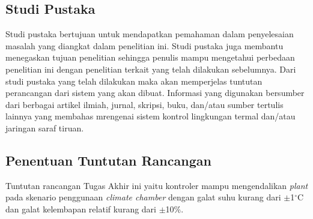 

\subsection{Studi Pustaka}
Studi pustaka bertujuan untuk mendapatkan pemahaman dalam penyelesaian masalah yang diangkat dalam penelitian ini. Studi pustaka juga membantu menegaskan tujuan penelitian sehingga penulis mampu mengetahui perbedaan penelitian ini dengan penelitian terkait yang telah dilakukan sebelumnya. Dari studi pustaka yang telah dilakukan maka akan memperjelas tuntutan perancangan dari sistem yang akan dibuat. Informasi yang digunakan bersumber dari berbagai artikel ilmiah, jurnal, skripsi, buku, dan/atau sumber tertulis lainnya yang membahas mrengenai sistem kontrol lingkungan termal dan/atau jaringan saraf tiruan.

\subsection{Penentuan Tuntutan Rancangan}

Tuntutan rancangan Tugas Akhir ini yaitu kontroler mampu mengendalikan \textit{plant} pada skenario penggunaan \textit{climate chamber} dengan galat suhu kurang dari $\pm$1$^\circ$C dan galat kelembapan relatif kurang dari $\pm$10\%.


